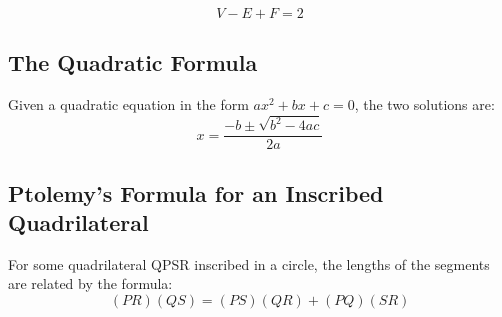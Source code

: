 \documentclass[final, letterpaper, 12pt]{article}
\begin{document}
		\begin{equation}
			V-E+F = 2
		\end{equation}
	
	\subsection{The Quadratic Formula}\label{sec: one of the most commonly used things in math team}
		Given a quadratic equation in the form $ax^2+bx+c = 0$, the two solutions are:
		\begin{equation}
			x = \frac{-b\pm \sqrt{b^2-4ac}}{2a}
		\end{equation}
	
	\subsection{Ptolemy's Formula for an Inscribed Quadrilateral}\label{sec: formula relating the distances between the vertices of an inscribed quadrilateral}
		For some quadrilateral QPSR inscribed in a circle, the lengths of the segments are related by the formula:
		\begin{equation}
			(PR)(QS) = (PS)(QR) + (PQ)(SR)
		\end{equation}
		
\end{document}
